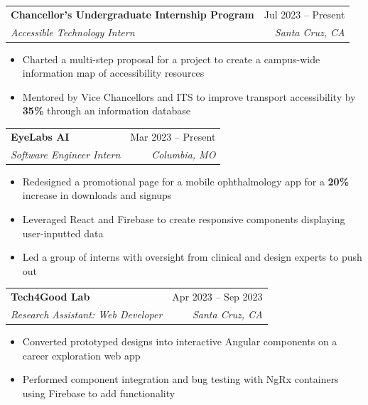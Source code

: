 \documentclass[letterpaper,11pt]{article}
\makeatletter
\newcommand{\resumeItem}[1]{
  \item\small{
    {#1 \vspace{-2pt}}
  }
}
\newcommand{\resumeSubheading}[4]{
  \vspace{-2pt}\item
    \begin{tabular*}{0.97\textwidth}[t]{l@{\extracolsep{\fill}}r}
      \textbf{#1} & #2 \\
      \textit{\small#3} & \textit{\small #4} \\
    \end{tabular*}\vspace{-7pt}
}
\newcommand{\resumeItemListStart}{\begin{itemize}}
\newcommand{\resumeItemListEnd}{\end{itemize}\vspace{-5pt}}
\makeatother
\begin{document}
\resumeSubheading
{Chancellor's Undergraduate Internship Program}{Jul 2023 -- Present}
{Accessible Technology Intern}{Santa Cruz, CA}
\resumeItemListStart
\resumeItem{Charted a multi-step proposal for a project to create a campus-wide information map of accessibility resources}
\resumeItem{Mentored by Vice Chancellors and ITS to improve transport accessibility by \textbf{35\%} through an information database}
\resumeItemListEnd

\resumeSubheading
{EyeLabs AI}{Mar 2023 -- Present}
{Software Engineer Intern}{Columbia, MO}
\resumeItemListStart
\resumeItem{Redesigned a promotional page for a mobile ophthalmology app for a \textbf{20\%} increase in downloads and signups}
\resumeItem{Leveraged React and Firebase to create responsive components displaying user-inputted data}
\resumeItem{Led a group of interns with oversight from clinical and design experts to push out}
\resumeItemListEnd

\resumeSubheading
{Tech4Good Lab}{Apr 2023 -- Sep 2023}
{Research Assistant: Web Developer}{Santa Cruz, CA}
\resumeItemListStart
\resumeItem{Converted prototyped designs into interactive Angular components on a career exploration web app}
\resumeItem{Performed component integration and bug testing with NgRx containers using Firebase to add functionality}
\resumeItemListEnd



\end{document}
